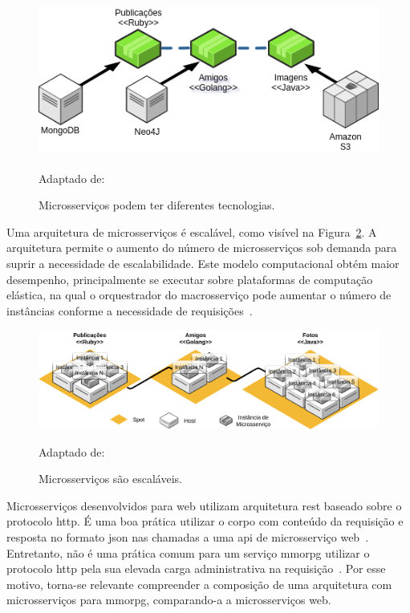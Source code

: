 \begin{figure}[htb!]
\caption{Microsserviços podem ter diferentes tecnologias.}
\label{fig:microsservicos_tecnologias}
\includegraphics[height=5cm]{img/cap2/microsservicos_tecnologias.png}
\centering

Adaptado de:~\cite{Newman2015Feb}
\end{figure}


Uma arquitetura de microsserviços é escalável, como visível na Figura~\ref{fig:microsservicos_escalabilidade}.
%
A arquitetura permite o aumento do número de microsserviços sob demanda para suprir a necessidade de escalabilidade.
%
Este modelo computacional obtém maior desempenho, principalmente se executar sobre plataformas de computação elástica, na qual o orquestrador do macrosserviço pode aumentar o número de instâncias conforme a necessidade de requisições~\cite{Nadareishvili2016Aug}.



\begin{figure}[htb!]
\caption{Microsserviços são escaláveis.}
\label{fig:microsservicos_escalabilidade}
\includegraphics[width=\textwidth]{img/cap2/microsservicos_escalabilidade.png}
\centering

Adaptado de:~\cite{Newman2015Feb}
\end{figure}



Microsserviços desenvolvidos para web utilizam arquitetura \ac{rest} baseado sobre o protocolo \ac{http}.
%
É uma boa prática utilizar o corpo com conteúdo da requisição e resposta no formato \ac{json} nas chamadas a uma \ac{api} de microsserviço web~\cite{Nadareishvili2016Aug}.
%
Entretanto, não é uma prática comum para um serviço \ac{mmorpg} utilizar o protocolo \ac{http} pela sua elevada carga administrativa na requisição~\cite{1417630}.
%
Por esse motivo, torna-se relevante compreender a composição de uma arquitetura com microsserviços para \ac{mmorpg}, comparando-a a microsserviços web.



